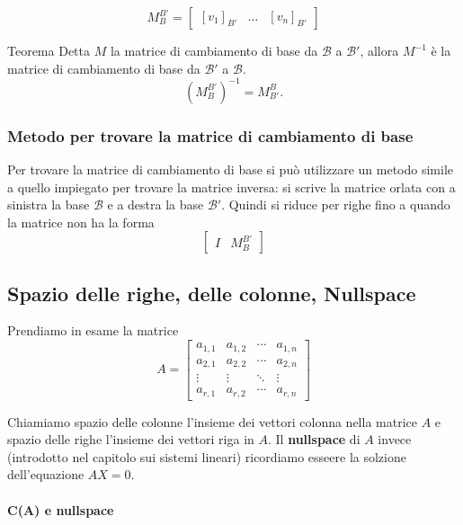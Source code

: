 \documentclass[x11names]{article}
\begin{document}
\[
M_{B}^{B'} =
\left[\begin{array}{c|c|c}
     \left[v_1\right]_{B'}
&  \dots & \left[v_{n}\right]_{B'}
\end{array}
\right]
\] 


\begin{center}
\colorbox{myred}{\begin{minipage}{5.75in}
\begin{redes}{Teorema}
Detta $M$ la matrice di cambiamento di base da $\mathscr{B}$ a $\mathscr{B}'$, allora $M^{-1}$ è la matrice di cambiamento di base da $\mathscr{B}'$ a $\mathscr{B}$.
\[
\left(M_{B}^{B'}\right)^{-1} = M_{B'}^{B} 
.\] 
\end{redes}
\end{minipage}}        
\end{center}

\subsubsection{Metodo per trovare la matrice di cambiamento di base}
Per trovare la matrice di cambiamento di base si può utilizzare un metodo simile a quello impiegato per trovare la matrice inversa: si scrive la matrice orlata con a sinistra la base $\mathscr{B}$ e a destra la base $\mathscr{B}'$. Quindi si riduce per righe fino a quando la matrice non ha la forma
\[
	\left[\begin{array}{c|c}
			I & M_{B}^{B'}
	\end{array}\right]
\] 

\subsection{Spazio delle righe, delle colonne, Nullspace}
Prendiamo in esame la matrice
\[
A=
\begin{bmatrix}a_{1,1}&a_{1,2}&\cdots &a_{1,n}\\a_{2,1}&a_{2,2}&\cdots &a_{2,n}\\ \vdots &\vdots &\ddots &\vdots \\a_{r,1}&a_{r,2}&\cdots &a_{r,n}\end{bmatrix}
\] 

Chiamiamo spazio delle colonne l'insieme dei vettori colonna nella matrice $A$ e spazio delle righe l'insieme dei vettori riga in  $A$. Il \textbf{nullspace} di $A$ invece (introdotto nel capitolo sui sistemi lineari) ricordiamo esseere la solzione dell'equazione  $AX = 0$.

\paragraph{C(A) e nullspace}
\end{document}
